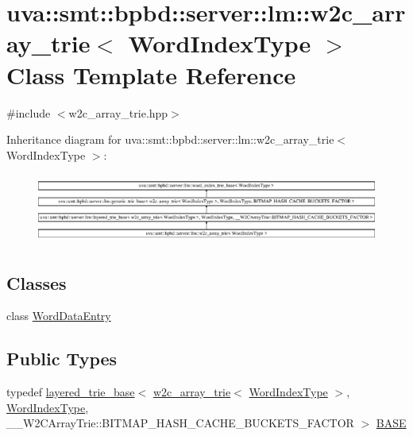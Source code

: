 \hypertarget{classuva_1_1smt_1_1bpbd_1_1server_1_1lm_1_1w2c__array__trie}{}\section{uva\+:\+:smt\+:\+:bpbd\+:\+:server\+:\+:lm\+:\+:w2c\+\_\+array\+\_\+trie$<$ Word\+Index\+Type $>$ Class Template Reference}
\label{classuva_1_1smt_1_1bpbd_1_1server_1_1lm_1_1w2c__array__trie}


{\ttfamily \#include $<$w2c\+\_\+array\+\_\+trie.\+hpp$>$}

Inheritance diagram for uva\+:\+:smt\+:\+:bpbd\+:\+:server\+:\+:lm\+:\+:w2c\+\_\+array\+\_\+trie$<$ Word\+Index\+Type $>$\+:\begin{figure}[H]
\begin{center}
\leavevmode
\includegraphics[height=2.338205cm]{classuva_1_1smt_1_1bpbd_1_1server_1_1lm_1_1w2c__array__trie}
\end{center}
\end{figure}
\subsection*{Classes}
\begin{DoxyCompactItemize}
\item 
class \hyperlink{classuva_1_1smt_1_1bpbd_1_1server_1_1lm_1_1w2c__array__trie_1_1_word_data_entry}{Word\+Data\+Entry}
\end{DoxyCompactItemize}
\subsection*{Public Types}
\begin{DoxyCompactItemize}
\item 
typedef \hyperlink{classuva_1_1smt_1_1bpbd_1_1server_1_1lm_1_1layered__trie__base}{layered\+\_\+trie\+\_\+base}$<$ \hyperlink{classuva_1_1smt_1_1bpbd_1_1server_1_1lm_1_1w2c__array__trie}{w2c\+\_\+array\+\_\+trie}$<$ \hyperlink{classuva_1_1smt_1_1bpbd_1_1server_1_1lm_1_1word__index__trie__base_a64279b5b94c421b25aedaa72e73d013c}{Word\+Index\+Type} $>$, \hyperlink{classuva_1_1smt_1_1bpbd_1_1server_1_1lm_1_1word__index__trie__base_a64279b5b94c421b25aedaa72e73d013c}{Word\+Index\+Type}, \+\_\+\+\_\+\+W2\+C\+Array\+Trie\+::\+B\+I\+T\+M\+A\+P\+\_\+\+H\+A\+S\+H\+\_\+\+C\+A\+C\+H\+E\+\_\+\+B\+U\+C\+K\+E\+T\+S\+\_\+\+F\+A\+C\+T\+O\+R $>$ \hyperlink{classuva_1_1smt_1_1bpbd_1_1server_1_1lm_1_1w2c__array__trie_aa34a328bdf938c35815589863e49eb6e}{B\+A\+S\+E}
\end{DoxyCompactItemize}
